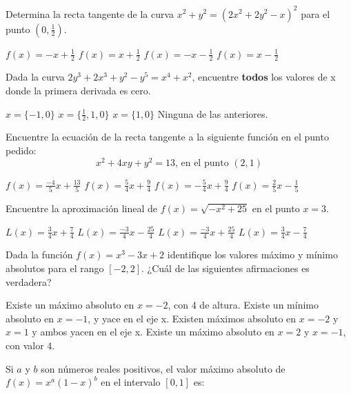 \question[5]
Determina la recta tangente de la curva $x^2 + y^2 = (2x^2 + 2y^2 - x)^2$  para el punto $(0, \frac{1}{2})$.
\droppoints

\begin{checkboxes}
\choice  $f(x) = -x + \frac{1}{2}$
\CorrectChoice $f(x) = x + \frac{1}{2}$
\choice $f(x) = -x - \frac{1}{2}$
\choice $f(x) = x - \frac{1}{2}$
\end{checkboxes}

\question[5]
Dada la curva $2y^3+2x^3+y^2-y^5=x^4+x^2$, encuentre \textbf{todos} los valores de x donde la primera derivada es cero.
\droppoints

\begin{checkboxes}
\choice  $x = \{-1, 0\}$
\CorrectChoice $x = \{\frac{1}{2}, 1,0\}$
\choice $x = \{1, 0\}$
\choice Ninguna de las anteriores.
\end{checkboxes}
\question[5]
Encuentre la ecuación de la recta tangente a la siguiente función en el punto pedido:
$$x^2 + 4xy + y^2 = 13 \text{, en el punto }(2,1)$$
\droppoints
\begin{checkboxes}
\CorrectChoice  $f(x) = \frac{-4}{5}x + \frac{13}{5}$
\choice $f(x) = \frac{5}{4}x + \frac{9}{4}$
\choice $f(x) = -\frac{5}{4}x + \frac{9}{4}$
\choice $f(x) = \frac{2}{5}x - \frac{1}{5}$
\end{checkboxes}
\question[5]
Encuentre la aproximación lineal de $f(x)=\sqrt{-x^2 + 25}$ en el punto $x=3$.
\droppoints

\begin{checkboxes}
\choice  $L(x) = \frac{3}{4}x + \frac{7}{4}$
\choice $L(x) = \frac{-3}{4}x - \frac{25}{4}$
\CorrectChoice $L(x) = \frac{-3}{4}x + \frac{25}{4}$
\choice $L(x) = \frac{3}{4}x - \frac{7}{4}$
\end{checkboxes}
\question[5]
Dada la función $f(x)=x^3-3x+2$ identifique los valores máximo y mínimo absolutos para el rango $[-2, 2]$. ¿Cuál de las siguientes afirmaciones es verdadera?
\droppoints

\begin{checkboxes}
\choice Existe un máximo absoluto en $x = -2$, con 4 de altura.
\choice Existe un mínimo absoluto en $x = -1$, y yace en el eje x.
\choice Existen máximos absoluto en $x = -2$ y $x = 1$ y ambos yacen en el eje x.
\CorrectChoice Existe un máximo absoluto en $x = 2$ y $x = -1$, con valor 4.
\end{checkboxes}
\pagebreak
\question[5]
Si $a$ y $b$ son números reales positivos, el valor máximo absoluto de $f(x) = x^a (1-x)^b$ en el intervalo $[0,1]$ es:
\droppoints

